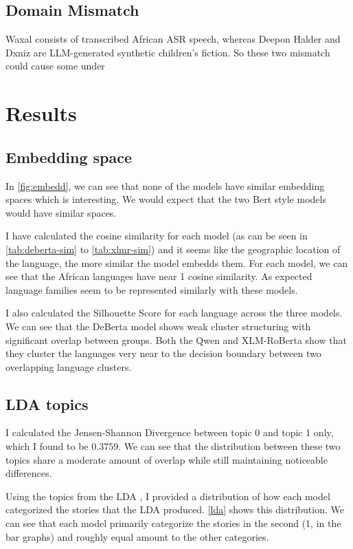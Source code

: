 \documentclass[11pt]{article} %
\begin{document}
    \subsection{Domain Mismatch}
    Waxal \citep{waxal2026} consists of transcribed African ASR speech, whereas Deepon
    Halder \citep{multilingual_tinystories_2026} and Dxniz \citep{dxniz2026tinystoriesmultilingual}
    are LLM-generated synthetic children's fiction. So these two mismatch could
    cause some under 

    \section{Results}
    \label{sec:results}
    \subsection{Embedding space}
    In \autoref{fig:embedd}, we can see that none of the models have similar
    embedding spaces which is interesting. We would expect that the two Bert style
    models would have similar spaces.

    I have calculated the cosine similarity for each model (as can be seen in
    \autoref{tab:deberta-sim} to \ref{tab:xlmr-sim}) and it seems like the geographic
    location of the language, the more similar the model embedds them. For each model,
    we can see that the African languages have near 1 cosine similarity. As expected
    language families seem to be represented similarly with these models.

    I also calculated the Silhouette Score for each language across the three models.
    We can see that the DeBerta model shows weak cluster structuring with
    significant overlap between groups. Both the Qwen and XLM-RoBerta show that they
    cluster the languages very near to the decision boundary between two overlapping
    language clusters.

    \subsection{LDA topics}
    I calculated the Jensen-Shannon Divergence between topic 0 and topic 1 only,
    which I found to be $0.3759$. We can see that the distribution between these two
    topics share a moderate amount of overlap while still maintaining noticeable differences.

    Using the topics from the LDA \citep{blei2003latent}, I provided a distribution
    of how each model categorized the stories that the LDA produced.
    \autoref{lda} shows this distribution. We can see that each model primarily categorize
    the stories in the second (1, in the bar graphs) and roughly equal amount to
    the other categories.
\end{document}
